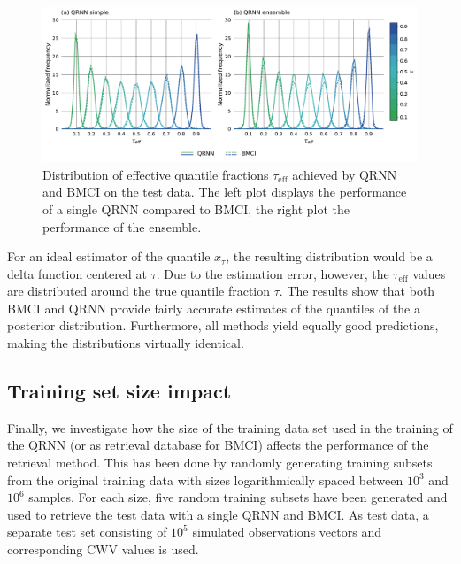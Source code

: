 \documentclass[journal abbreviation, manuscript]{copernicus}
\begin{document}
  \begin{figure}[hbpt!]
    \centering
    \includegraphics[width = 0.8\linewidth]{../plots/fig04}
    \caption{Distribution of effective quantile fractions $\tau_\text{eff}$ achieved by
      QRNN and BMCI on the test data. The left plot displays the performance of a
      single QRNN compared to BMCI, the right plot the performance of the ensemble.}
    \label{fig:quantile_fractions}
  \end{figure}

  For an ideal estimator of the quantile $x_\tau$, the resulting distribution
  would be a delta function centered at $\tau$. Due to the estimation error,
  however, the $\tau_{\text{eff}}$ values are distributed around the true quantile
  fraction $\tau$. The results show that both BMCI and QRNN provide fairly
  accurate estimates of the quantiles of the a posterior distribution. Furthermore,
  all methods  yield equally good predictions, making the distributions virtually
  identical.

\subsection{Training set size impact}

Finally, we investigate how the size of the training data set used in the training
of the QRNN (or as retrieval database for BMCI) affects the performance of the
retrieval method. This has been done by randomly generating training subsets
from the original training data with sizes logarithmically spaced between $10^3$
and $10^6$ samples. For each size, five random training subsets have been
generated and used to retrieve the test data with a single QRNN and BMCI. As test data,
a separate test set consisting of $10^5$ simulated observations vectors and
corresponding CWV values is used.
\end{document}
